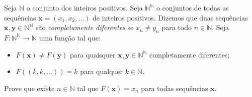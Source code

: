 Seja $\mathbb{N}$ o conjunto dos inteiros positivos. Seja $\mathbb{N}^\mathbb{N}$ o conjuntos de todas as sequências $\mathbf x = (x_1, x_2, \dots)$ de inteiros positivos.
Dizemos que duas sequências $\mathbf x, \mathbf y \in \mathbb{N}^\mathbb{N}$ são \emph{completamente diferentes} se $x_n \neq y_n$ para todo $n\in \mathbb{N}$.
Seja $F \colon \mathbb{N}^\mathbb{N} \to \mathbb{N}$ uma função tal que: 
\begin{itemize}
	\item $F(\mathbf x)\neq F(\mathbf y)$ para quaisquer $\mathbf x, \mathbf y \in \mathbb{N}^\mathbb{N}$ completamente diferentes;
	\item $F \left((k,k,\dots)\right)=k$ para qualquer $k \in \mathbb{N}$.
\end{itemize}
Prove que existe $n\in \mathbb{N}$ tal que $F(\mathbf x)=x_{n}$ para todas sequências $\mathbf x$.
